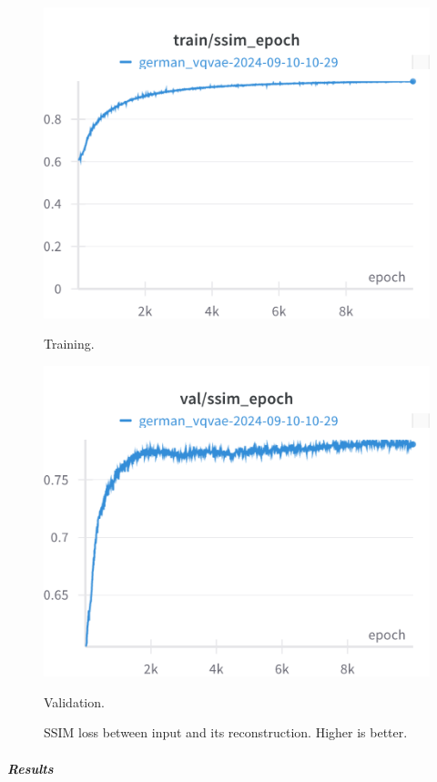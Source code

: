 \begin{figure}[H]
\includegraphics[width=\linewidth]{detailed_engineering/German VQVAE/charts/train_ssim.png}
\caption{Training.}
\endminipage\hfill
{}
\includegraphics[width=\linewidth]{detailed_engineering/German VQVAE/charts/val_ssim.png}
\caption{Validation.}
\endminipage
\caption{SSIM loss between input and its reconstruction. Higher is better.}
\end{figure}




\subparagraph{Results}\mbox{}\\

